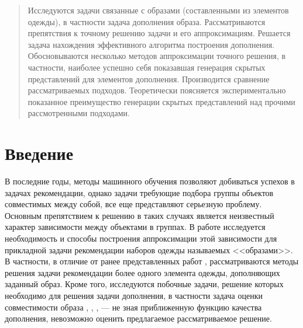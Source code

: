 \documentclass[a4paper,14pt]{extarticle}
\begin{document}
	\setcounter{page}{2}
	\vspace*{\fill}
	\begin{abstract}	
	 	Исследуются задачи связанные с образами (составленными из элементов одежды), в частности задача дополнения образа. Рассматриваются препятствия к точному решению задачи и его аппроксимациям. Решается задача нахождения эффективного алгоритма построения дополнения. Обосновываются несколько методов аппроксимации точного решения, в частности, наиболее успешно себя показавшая генерация скрытых представлений для элементов дополнения. Производится сравнение рассматриваемых подходов. Теоретически поясняется экспериментально показанное преимущество генерации скрытых представлений над прочими рассмотренными подходами.
	\end{abstract}
	\vspace*{\fill}
\newpage
\tableofcontents 
\newpage

	\section{Введение}
		В последние годы, методы машинного обучения позволяют добиваться успехов в задачах рекомендации, однако задачи требующие подбора группы объектов совместимых между собой, все еще представляют серьезную проблему. Основным препятствием к решению в таких случаях является неизвестный характер зависимости между объектами в группах. В работе исследуется необходимость и способы построения аппроксимации этой зависимости для прикладной задачи рекомендации наборов одежды называемых <<образами>>. 
		В частности, в отличие от ранее представленных работ \cite{https://doi.org/10.48550/arXiv.1908.11754} \cite{https://doi.org/10.48550/arXiv.2005.12566}  \cite{https://doi.org/10.48550/arXiv.2204.04812}, рассматриваются методы решения задачи рекомендации более одного элемента одежды, дополняющих заданный образ. Кроме того, исследуются побочные задачи, решение которых необходимо для решения задачи дополнения, в частности задача оценки совместимости образа \cite{Wang_2019}, \cite{su2021complementary}, \cite{Cui_2019}, \cite{balim2023diagnosing}	--- не зная приближенную функцию качества дополнения, невозможно оценить предлагаемое рассматриваемое решение.
		
\end{document}
